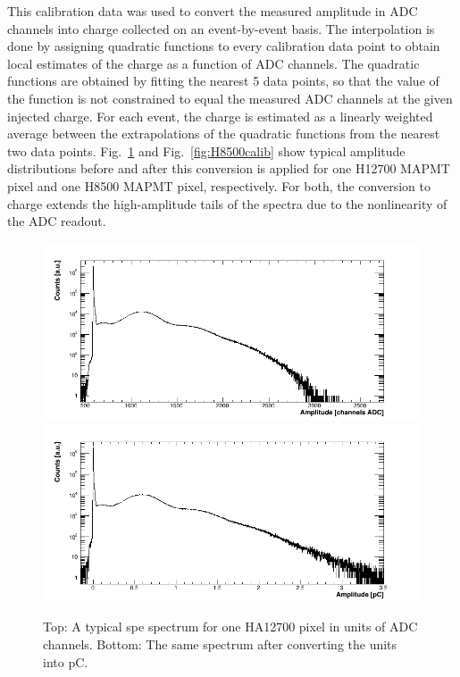 This calibration data was used to convert the measured amplitude in ADC channels into charge collected on an event-by-event basis. The interpolation is done by assigning quadratic functions to every calibration data point to obtain local estimates of the charge as a function of ADC channels. The quadratic functions are obtained by fitting the nearest 5 data points, so that the value of the function is not constrained to equal the measured ADC channels at the given injected charge. For each event, the charge is estimated as a linearly weighted average between the extrapolations of the quadratic functions from the nearest two data points. Fig.~\ref{fig:H12700calib} and Fig.~\ref{fig:H8500calib} show typical amplitude distributions before and after this conversion is applied for one H12700 MAPMT pixel and one H8500 MAPMT pixel, respectively. For both, the conversion to charge extends the high-amplitude tails of the spectra due to the nonlinearity of the ADC readout.

\begin{figure}[hbt!]
	\centering
	\includegraphics[width=\linewidth]{figures/GA0982_w1_g064_v1100_063_adc.png}
	\includegraphics[width=\linewidth]{figures/GA0982_w1_g064_v1100_063_pC.png}	
	\caption{Top: A typical spe spectrum for one HA12700 pixel in units of ADC channels. Bottom: The same spectrum after converting the units into pC.}
	\label{fig:H12700calib}
\end{figure}

